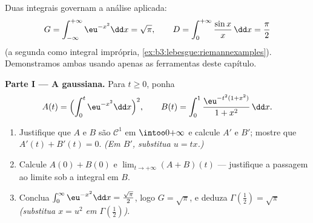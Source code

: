 \begin{problem}
\label{pb:b3:lebesgue:1}
Duas integrais governam a análise aplicada:
\[
G = \int_{-\infty}^{+\infty}\eu^{-x^2}\dd x = \sqrt\pi,
\qquad
D = \int_0^{+\infty}\frac{\sin x}{x}\,\dd x = \frac\pi2
\]
(a segunda como integral imprópria, \cref{ex:b3:lebesgue:riemannexamples}). Demonstramos ambas
usando apenas as ferramentas deste capítulo.

\medskip
\noindent\textbf{Parte I --- A gaussiana.} Para $t \geq 0$, ponha
\[
A(t) = \Bigl(\int_0^t\eu^{-x^2}\dd x\Bigr)^{2},
\qquad
B(t) = \int_0^1\frac{\eu^{-t^2(1 + x^2)}}{1 + x^2}\,\dd x .
\]
\begin{enumerate}
  \item Justifique que $A$ e $B$ são $\mathcal C^1$ em $\intoo0{+\infty}$ e calcule
        $A'$ e $B'$; mostre que $A'(t) + B'(t) = 0$. \emph{(Em $B'$,
        substitua $u =
        tx$.)}
  \item Calcule $A(0) + B(0)$ e $\lim_{t\to+\infty}(A + B)(t)$ --- justifique a passagem ao limite sob a
        integral em $B$.
  \item Conclua $\int_0^\infty \eu^{-x^2}\dd x =
        \frac{\sqrt\pi}2$, logo $G = \sqrt\pi$, e deduza $\Gamma(\tfrac12) = \sqrt\pi$ \emph{(substitua $x =
        u^2$
        em $\Gamma(\frac12)$)}.
\end{enumerate}


\end{problem}
